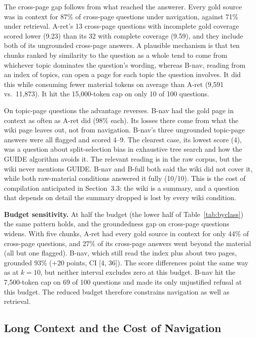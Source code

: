 \documentclass[letterpaper]{article} %
\begin{document}
The cross-page gap follows from what reached the answerer. Every gold source was in context for 87\% of cross-page questions under navigation, against 71\% under retrieval. A-ret's 13 cross-page questions with incomplete gold coverage scored lower (9.23) than its 32 with complete coverage (9.59), and they include both of its ungrounded cross-page answers. A plausible mechanism is that ten chunks ranked by similarity to the question as a whole tend to come from whichever topic dominates the question's wording, whereas B-nav, reading from an index of topics, can open a page for each topic the question involves. It did this while consuming fewer material tokens on average than A-ret (9{,}591 vs.\ 11{,}873). It hit the 15{,}000-token cap on only 10 of 100 questions.

On topic-page questions the advantage reverses. B-nav had the gold page in context as often as A-ret did (98\% each). Its losses there come from what the wiki page leaves out, not from navigation. B-nav's three ungrounded topic-page answers were all flagged and scored 4--9. The clearest case, its lowest score (4), was a question about split-selection bias in exhaustive tree search and how the GUIDE algorithm avoids it. The relevant reading is in the raw corpus, but the wiki never mentions GUIDE. B-nav and B-full both said the wiki did not cover it, while both raw-material conditions answered it fully (10/10). This is the cost of compilation anticipated in Section~3.3: the wiki is a summary, and a question that depends on detail the summary dropped is lost by every wiki condition.

\textbf{Budget sensitivity.} At half the budget (the lower half of Table~\ref{tab:byclass}) the same pattern holds, and the groundedness gap on cross-page questions widens. With five chunks, A-ret had every gold source in context for only 44\% of cross-page questions, and 27\% of its cross-page answers went beyond the material (all but one flagged). B-nav, which still read the index plus about two pages, grounded 93\% ($+20$ points, CI [4, 36]). The score differences point the same way as at $k{=}10$, but neither interval excludes zero at this budget. B-nav hit the 7{,}500-token cap on 69 of 100 questions and made its only unjustified refusal at this budget. The reduced budget therefore constrains navigation as well as retrieval.

\subsection{Long Context and the Cost of Navigation}
\end{document}
